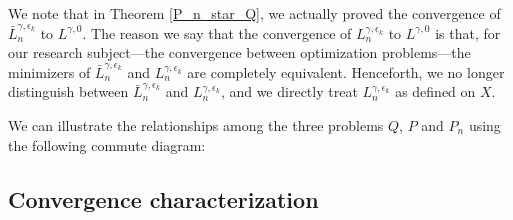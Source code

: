 \documentclass{amsart}
\begin{document}
We note that in Theorem \ref{P_n_star_Q}, we actually proved the convergence of \(\bar{L}_n^{\gamma,\epsilon_k}\) to \(L^{\gamma,0}\). The reason we say that the convergence of \(L_n^{\gamma,\epsilon_k}\) to \(L^{\gamma,0}\) is that, for our research subject—the convergence between optimization problems—the minimizers of \(\bar{L}_n^{\gamma,\epsilon_k}\) and \(L_n^{\gamma,\epsilon_k}\) are completely equivalent. Henceforth, we no longer distinguish between \(\bar{L}_n^{\gamma,\epsilon_k}\) and \(L_n^{\gamma,\epsilon_k}\), and we directly treat \(L_n^{\gamma,\epsilon_k}\) as defined on \(X\).

We can illustrate the relationships among the three problems $Q$, $P$ and $P_n$ using the following commute diagram:
\begin{center}
\end{center}

\subsection{Convergence characterization}
\end{document}
